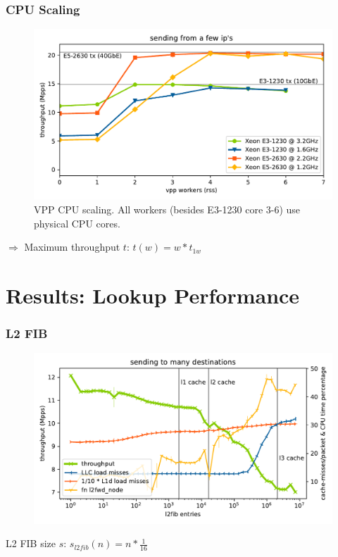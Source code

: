 \begin{frame}
    \frametitle{CPU Scaling}



    \begin{figure}[!ht]
    \noindent\hspace{0.5mm}\includegraphics[width=.85\linewidth]{pics/throughput_summary_multicore.pdf}
    \caption{VPP CPU scaling. All workers (besides E3-1230 core 3-6) use physical CPU cores. }
    \label{graph:multicore}
    \end{figure}
    \hspace{8mm} $\Rightarrow$ Maximum throughput $t$: $ t(w) = w * t_{1w}$
\end{frame}

\section{Results: Lookup Performance}

\begin{frame}
    \frametitle{L2 FIB}


    \begin{figure}[!ht]
    \noindent\hspace{0.5mm}\includegraphics[width=0.85\linewidth]{pics/throughput_l2_throughmac_klaipeda32ghz_v3.pdf}
    \label{graph:l2fib}
    \end{figure}
    \hspace{8mm} L2 FIB size $s$: $ s_{l2fib}(n) = n * \frac{1}{16}  $
\end{frame}

